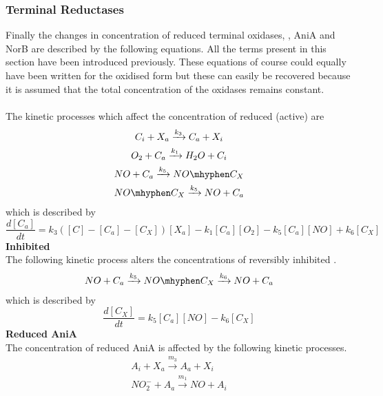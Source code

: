 \subsubsection{Terminal Reductases}
Finally the changes in concentration of reduced terminal oxidases, \cbbthree{}, AniA and NorB are described by the following equations. All the terms present in this section have been introduced previously. These equations of course could equally have been written for the oxidised form but these can easily be recovered because it is assumed that the total concentration of the oxidases remains constant.\\
\clearpage
{}\\
The kinetic processes which affect the concentration of reduced (active) \cbbthree{} are
\begin{equation*}
\begin{gathered}
C_i + X_a \xrightarrow{k_3} C_a + X_i\\
O_2 + C_a\xrightarrow{k_1} H_{2}O + C_i\\
NO + C_a \xrightarrow{k_5} NO\mhyphen C_X\\
NO\mhyphen C_X \xrightarrow{k_5} NO + C_a
\end{gathered}
\end{equation*}
which is described by
\begin{equation}
\frac{d[C_a]}{dt} = k_3([C] - [C_a] - [C_X])[X_a] - k_{1}[C_a][O_2] - k_5[C_a][NO] + k_6[C_X]
\label{eq:active_cbb3}
\end{equation}
{\bf Inhibited \cbbthree{}}\\
The following kinetic process alters the concentrations of reversibly inhibited \cbbthree{}.
\begin{equation*}
\begin{gathered}
 NO + C_a \xrightarrow{k_5} NO\mhyphen C_X \xrightarrow{k_6} NO + C_a
\end{gathered}
\end{equation*}
which is described by
\begin{equation}
\frac{d[C_X]}{dt} = k_5[C_a][NO] - k_6 [C_X]
\label{eq:NO inhibited_cbb3}
\end{equation}
{\bf Reduced AniA}\\
The concentration of reduced AniA is affected by the following kinetic processes.
\begin{equation*}
\begin{gathered}
A_i + X_a \xrightarrow{m_3} A_a + X_i \\
NO_2^- + A_a \xrightarrow{m_1} NO + A_i
\end{gathered}
\end{equation*}
